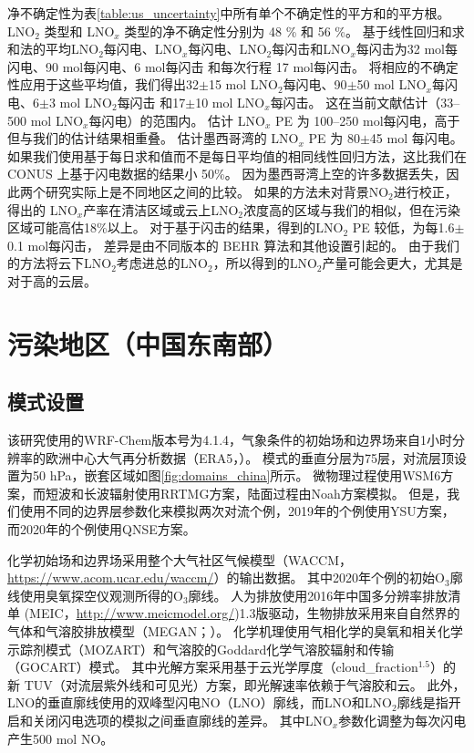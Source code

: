 净不确定性为表\ref{table:us_uncertainty}中所有单个不确定性的平方和的平方根。
LNO$_2$ 类型和 LNO$_x$ 类型的净不确定性分别为 48 \% 和 56 \%。
基于线性回归和求和法的平均LNO$_2$每闪电、LNO$_x$每闪电、LNO$_2$每闪击和LNO$_x$每闪击为32 mol每闪电、90 mol每闪电、6 mol每闪击 和每次行程 17 mol每闪击。
将相应的不确定性应用于这些平均值，我们得出32$\pm$15 mol LNO$_2$每闪电、90$\pm$50 mol LNO$_x$每闪电、6$\pm$3 mol LNO$_2$每闪击 和17$\pm$10 mol LNO$_x$每闪击。
这在当前文献估计（33--500 mol LNO$_x$每闪电）的范围内\citep{Schumann.2007,Beirle.2010,Bucsela.2010}。
\citet{Bucsela.2010}估计 LNO$_x$ PE 为 100--250 mol每闪电，高于但与我们的估计结果相重叠。
\citet{Pickering.2016}估计墨西哥湾的 LNO$_x$ PE 为 80$\pm$45 mol 每闪电。
如果我们使用基于每日求和值而不是每日平均值的相同线性回归方法，这比我们在 CONUS 上基于闪电数据的结果小 50\%。
因为墨西哥湾上空的许多数据丢失，因此两个研究实际上是不同地区之间的比较。
如果\citet{Pickering.2016}的方法未对背景NO$_2$进行校正，得出的 LNO$_x$产率在清洁区域或云上LNO$_2$浓度高的区域与我们的相似，但在污染区域可能高估18\%以上。
对于基于闪击的结果，\citet{Lapierre.2020}得到的LNO$_2$ PE 较低，为每1.6$\pm$0.1 mol每闪击，
差异是由不同版本的 BEHR 算法和其他设置引起的。
由于我们的方法将云下LNO$_2$考虑进总的LNO$_2$，所以得到的LNO$_2$产量可能会更大，尤其是对于高的云层。


\section{污染地区（中国东南部）} \label{sec:china}

\subsection{模式设置} \label{sec:model_settings_china}

该研究使用的WRF-Chem版本号为4.1.4，气象条件的初始场和边界场来自1小时分辨率的欧洲中心大气再分析数据（ERA5，\citet{Hersbach.2020}）。
模式的垂直分层为75层，对流层顶设置为50 hPa，嵌套区域如图\ref{fig:domains_china}所示。
微物理过程使用WSM6方案\citep{Hong.2006a}，而短波和长波辐射使用RRTMG方案\citep{Iacono.2008}，陆面过程由Noah方案模拟\citep{Koren.1999}。
但是，我们使用不同的边界层参数化来模拟两次对流个例，2019年的个例使用YSU方案\citep{Hong.2006}，而2020年的个例使用QNSE方案\citep{Sukoriansky.2005}。

化学初始场和边界场采用整个大气社区气候模型（WACCM，\url{https://www.acom.ucar.edu/waccm/}）的输出数据。
其中2020年个例的初始O$_3$廓线使用臭氧探空仪观测所得的O$_3$廓线。
人为排放使用2016年中国多分辨率排放清单 (MEIC，\url{http://www.meicmodel.org/})1.3版驱动，生物排放采用来自自然界的气体和气溶胶排放模型（MEGAN；\citet{Guenther.2006}）。
化学机理使用气相化学的臭氧和相关化学示踪剂模式（MOZART）和气溶胶的Goddard化学气溶胶辐射和传输（GOCART）模式\citep{Pfister.2011}。
其中光解方案采用基于云光学厚度（cloud\_fraction$^{1.5}$）的新 TUV（对流层紫外线和可见光）方案，即光解速率依赖于气溶胶和云。
此外，LNO的垂直廓线使用\citet{Ott.2010}的双峰型闪电NO（LNO）廓线\citep{Laughner.2017}，而LNO和LNO$_2$廓线是指开启和关闭闪电选项的模拟之间垂直廓线的差异。
其中LNO$_x$参数化调整为每次闪电产生500 mol NO\citep{Zhu.2019}。

